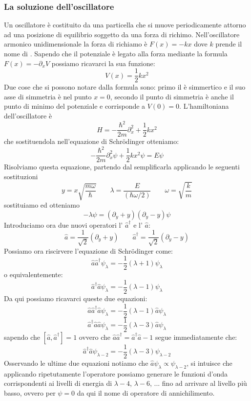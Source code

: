 \subsubsection{La soluzione dell'oscillatore}
Un oscillatore è costituito da una particella che si muove periodicamente attorno ad una posizione di equilibrio soggetto da una forza di richimo. Nell'oscillatore armonico unidimensionale la forza di richiamo è $F(x) = -kx$ dove $k$ prende il nome di . Sapendo che il potenziale è legato alla forza mediante la formula $F(x) = -\partial_x V$ possiamo ricavarci la sua funzione:
$$V(x) = \frac{1}{2}kx^2$$
Due cose che si possono notare dalla formula sono: primo il  è simmertico e il suo asse di simmetria è nel punto $x = 0$, secondo il punto di simmetria è anche il punto di minimo del potenziale e corrisponde a $V(0) = 0$.
L'hamiltoniana dell'oscillatore è
$$H = - \frac{\hbar^2}{2m} \partial_x^2 + \frac{1}{2}kx^2$$
che sostituendola nell'equazione di Schr\"odinger otteniamo:
$$- \frac{\hbar^2}{2m} \partial_x^2\psi + \frac{1}{2}kx^2\psi = E\psi$$
Risolviamo questa equazione, partendo dal semplificarla applicando le seguenti sostituzioni
$$y = x\sqrt{\frac{m\omega}{\hbar}} \qquad \lambda = \frac{E}{(\hbar \omega / 2)} \qquad \omega = \sqrt{\frac{k}{m}}$$
sostituiamo ed otteniamo
$$-\lambda \psi = (\partial_y + y)(\partial_y - y)\psi$$
Introduciamo ora due nuovi operatori l' $\hat{a}^{\dagger}$ e l' $\hat{a}$:
$$\hat{a} = \frac{1}{\sqrt{2}}(\partial_y + y) \qquad \hat{a}^{\dagger} = \frac{1}{\sqrt{2}}(\partial_y - y)$$
Possiamo ora riscirvere l'equazione di Schr\"odinger come:
$$\hat{a}\hat{a}^{\dagger}\psi_{\lambda} = -\frac{1}{2}(\lambda + 1) \psi_{\lambda}$$
o equivalentemente:
$$\hat{a}^{\dagger}\hat{a}\psi_{\lambda} = -\frac{1}{2}(\lambda - 1) \psi_{\lambda}$$
Da qui possiamo ricavarci queste due equazioni:
$$\hat{a}\hat{a}^{\dagger}\hat{a}\psi_{\lambda} = -\frac{1}{2}(\lambda - 1) \hat{a}\psi_{\lambda}$$
$$\hat{a}^{\dagger}\hat{a}\hat{a}\psi_{\lambda} = -\frac{1}{2}(\lambda - 3) \hat{a}\psi_{\lambda}$$
sapendo che $[\hat{a}, \hat{a}^{\dagger}] = 1$ ovvero che $\hat{a}\hat{a}^{\dagger} = \hat{a}^{\dagger}\hat{a} - 1$ segue immediatamente che:
$$\hat{a}^{\dagger}\hat{a}\psi_{\lambda-2} = -\frac{1}{2}(\lambda - 3) \psi_{\lambda-2}$$
Osservando le ultime due equazioni notiamo che $\hat{a}\psi_{\lambda} \propto \psi_{\lambda-2}$, si intuisce che applicando ripetutamente l'operatore possiamo generare le funzioni d'onda corrispondenti ai livelli di energia di $\lambda-4$, $ \lambda-6$, ... fino ad arrivare al livello più basso, ovvero per $\psi = 0$ da qui il nome di operatore di annichilimento.
